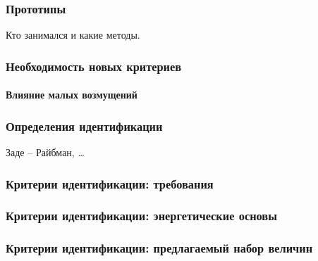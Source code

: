 \documentclass[10pt,utf8]{beamer}
\begin{document}

\begin{frame}
  \frametitle{Прототипы}

  Кто занимался и какие методы.


\end{frame}










\begin{frame}
  \frametitle{Необходимость новых критериев}
  \framesubtitle{Влияние малых возмущений}


\end{frame}




\begin{frame}
  \frametitle{Определения идентификации}

  Заде -- Райбман, \ldots


\end{frame}



\begin{frame}
  \frametitle{Критерии идентификации: требования}


\end{frame}




\begin{frame}
  \frametitle{Критерии идентификации: энергетические основы}


\end{frame}




\begin{frame}
  \frametitle{Критерии идентификации: предлагаемый набор величин}


\end{frame}
\end{document}
